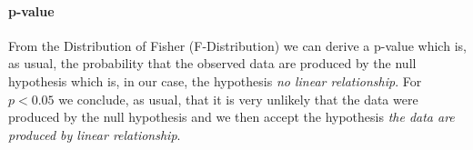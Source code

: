 \paragraph{p-value}

From the Distribution of Fisher (F-Distribution) we can derive a p-value which is, as usual, the probability that the observed data are produced by the null hypothesis which is, in our case, the hypothesis \textit{no linear relationship}. For $p < 0.05$ we conclude, as usual, that it is very unlikely that the data were produced by the null hypothesis and we then accept the hypothesis \textit{the data are produced by linear relationship}.














